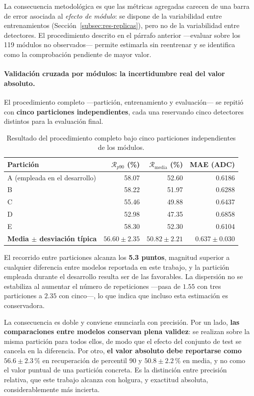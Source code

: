La consecuencia metodológica es que las métricas agregadas carecen de una barra de error asociada al
\emph{efecto de módulo}: se dispone de la variabilidad entre entrenamientos
(Sección~\ref{subsec:res-replicas}), pero no de la variabilidad entre detectores. El procedimiento
descrito en el párrafo anterior ---evaluar sobre los 119 módulos no observados--- permite estimarla
sin reentrenar y se identifica como la comprobación pendiente de mayor valor.

\paragraph{Validación cruzada por módulos: la incertidumbre real del valor absoluto.} El
procedimiento completo ---partición, entrenamiento y evaluación--- se repitió con
\textbf{cinco particiones independientes}, cada una reservando cinco detectores distintos
para la evaluación final.

\begin{table}[htbp]
\centering
\caption{Resultado del procedimiento completo bajo cinco particiones independientes de los
módulos.}
\label{tab:cv-particiones}
\small
\begin{tabular}{lrrr}
\toprule
\textbf{Partición} & $\mathcal{R}_{p90}$ (\%) & $\mathcal{R}_{\text{media}}$ (\%) &
\textbf{MAE} (ADC) \\
\midrule
A (empleada en el desarrollo) & 58.07 & 52.60 & 0.6186 \\
B & 58.22 & 51.97 & 0.6288 \\
C & 55.46 & 49.88 & 0.6437 \\
D & 52.98 & 47.35 & 0.6858 \\
E & 58.30 & 52.30 & 0.6104 \\
\midrule
\textbf{Media $\pm$ desviación típica} & $\mathbf{56.60 \pm 2.35}$ &
$\mathbf{50.82 \pm 2.21}$ & $0.637 \pm 0.030$ \\
\bottomrule
\end{tabular}
\end{table}

El recorrido entre particiones alcanza los \textbf{5.3 puntos}, magnitud superior a cualquier
diferencia entre modelos reportada en este trabajo, y la partición empleada durante el
desarrollo resulta ser de las favorables. La dispersión no se estabiliza al aumentar el
número de repeticiones ---pasa de $1.55$ con tres particiones a $2.35$ con cinco---, lo que
indica que incluso esta estimación es conservadora.

La consecuencia es doble y conviene enunciarla con precisión. Por un lado, \textbf{las
comparaciones entre modelos conservan plena validez}: se realizan sobre la misma partición
para todos ellos, de modo que el efecto del conjunto de test se cancela en la diferencia. Por
otro, \textbf{el valor absoluto debe reportarse como $56.6 \pm 2.3\,\%$} en recuperación de
percentil 90 y $50.8 \pm 2.2\,\%$ en media, y no como el valor puntual de una partición
concreta. Es la distinción entre precisión relativa, que este trabajo alcanza con holgura, y
exactitud absoluta, considerablemente más incierta.

